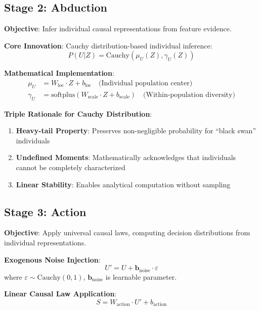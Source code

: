 \documentclass[conference]{IEEEtran}
\newcommand{\cauchy}{\text{Cauchy}}
\begin{document}
\subsection{Stage 2: Abduction}

\textbf{Objective}: Infer individual causal representations from feature evidence.

\textbf{Core Innovation}: Cauchy distribution-based individual inference:
\begin{equation}
P(U|Z) = \cauchy(\mu_U(Z), \gamma_U(Z))
\end{equation}

\textbf{Mathematical Implementation}:
\begin{align}
\mu_U &= W_{\text{loc}} \cdot Z + b_{\text{loc}} \quad \text{(Individual population center)} \\
\gamma_U &= \text{softplus}(W_{\text{scale}} \cdot Z + b_{\text{scale}}) \quad \text{(Within-population diversity)}
\end{align}

\textbf{Triple Rationale for Cauchy Distribution}:
\begin{enumerate}
\item \textbf{Heavy-tail Property}: Preserves non-negligible probability for ``black swan'' individuals
\item \textbf{Undefined Moments}: Mathematically acknowledges that individuals cannot be completely characterized  
\item \textbf{Linear Stability}: Enables analytical computation without sampling
\end{enumerate}

\subsection{Stage 3: Action}

\textbf{Objective}: Apply universal causal laws, computing decision distributions from individual representations.

\textbf{Exogenous Noise Injection}:
\begin{equation}
U' = U + \mathbf{b}_{\text{noise}} \cdot \varepsilon
\end{equation}
where $\varepsilon \sim \cauchy(0, 1)$, $\mathbf{b}_{\text{noise}}$ is learnable parameter.

\textbf{Linear Causal Law Application}:
\begin{equation}
S = W_{\text{action}} \cdot U' + b_{\text{action}}
\end{equation}
\end{document}
